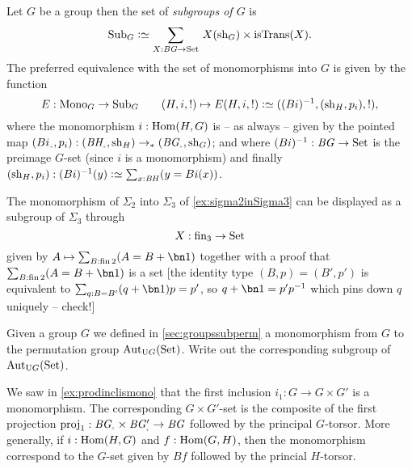 \begin{definition}
  Let $G$ be a group then the set of \emph{subgroups of $G$} is
  $$\typesubgroup_G\defequi\sum_{X:\BG\to\Set}{\,}X(\sh_G)\times\mathrm{isTrans}(X).$$
  The preferred equivalence 
 with the set of monomorphisms into $G$ is given by the function
  $$E:\typemono_G\to\typesubgroup_G\qquad (H,i,!)\mapsto E(H,i,!)\defequi ((Bi)^{-1},(\sh_H,p_i),!),$$
  where the monomorphism $i:\Hom(H,G)$ is -- as always -- given by the pointed map $(Bi_\div,p_i):(\BH_\div,\sh_H)\to_*(\BG_\div,\sh_G)$; and where $(Bi)^{-1}:\mathit{B}\mathit{G}\to\mathrm{Set}$ is the preimage $G$-set (since $i$ is a monomorphism)  and finally $(\sh_H,p_i):(Bi)^{-1}(y)\defequi \sum_{x:\BH}(y=Bi(x))$.
\end{definition}
%
%
  \begin{example}
    The monomorphism of $\Sigma_2$ into $\Sigma_3$ of \cref{ex:sigma2inSigma3} can be displayed as a subgroup of $\Sigma_3$ through 
    $$X:\fin_3\to\Set
    $$
    given by $A\mapsto\sum_{B:\fin 2}(A=B+\bn 1)$ together with a proof that $\sum_{B:\fin 2}(A=B+\bn 1)$ is a set [the identity type $(B,p)=(B',p')$ is equivalent to $\sum_{q:B=B'}(q+\bn 1)p=p'$, so $q+\bn 1=p'p^{-1}$ which pins down $q$ uniquely  -- check!]
  \end{example}
  \begin{xca}
    Given a group $G$ we defined in \cref{sec:groupssubperm} a monomorphism from $G$ to the permutation group $\aut_{\USym G}(\Set)$. Write out the corresponding subgroup of $\aut_{\USym G}(\Set)$.
  \end{xca}
\begin{example}  
  \label{ex:prodinclisGset}
  We saw in \cref{ex:prodinclismono} that the first inclusion $i_1:G\to G\times G'$ is a monomorphism.  The corresponding $G\times G'$-set is the composite of the first projection $\mathrm{proj}_1:\BG_\div\times\BG'_\div\to \BG$ followed by the principal $G$-torsor.  More generally, if $i:\Hom(H,G)$ and $f:\Hom(G,H)$, then the monomorphism correspond to the $G$-set given by $Bf$ followed by the princial $H$-torsor.
\end{example}



